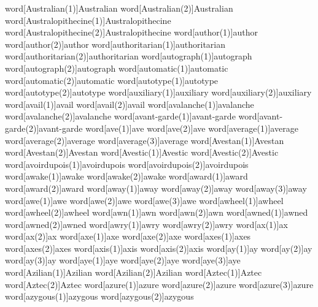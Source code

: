 word[Australian(1)]{Australian}
word[Australian(2)]{Australian}
word[Australopithecine(1)]{Australopithecine}
word[Australopithecine(2)]{Australopithecine}
word[author(1)]{author}
word[author(2)]{author}
word[authoritarian(1)]{authoritarian}
word[authoritarian(2)]{authoritarian}
word[autograph(1)]{autograph}
word[autograph(2)]{autograph}
word[automatic(1)]{automatic}
word[automatic(2)]{automatic}
word[autotype(1)]{autotype}
word[autotype(2)]{autotype}
word[auxiliary(1)]{auxiliary}
word[auxiliary(2)]{auxiliary}
word[avail(1)]{avail}
word[avail(2)]{avail}
word[avalanche(1)]{avalanche}
word[avalanche(2)]{avalanche}
word[avant-garde(1)]{avant-garde}
word[avant-garde(2)]{avant-garde}
word[ave(1)]{ave}
word[ave(2)]{ave}
word[average(1)]{average}
word[average(2)]{average}
word[average(3)]{average}
word[Avestan(1)]{Avestan}
word[Avestan(2)]{Avestan}
word[Avestic(1)]{Avestic}
word[Avestic(2)]{Avestic}
word[avoirdupois(1)]{avoirdupois}
word[avoirdupois(2)]{avoirdupois}
word[awake(1)]{awake}
word[awake(2)]{awake}
word[award(1)]{award}
word[award(2)]{award}
word[away(1)]{away}
word[away(2)]{away}
word[away(3)]{away}
word[awe(1)]{awe}
word[awe(2)]{awe}
word[awe(3)]{awe}
word[awheel(1)]{awheel}
word[awheel(2)]{awheel}
word[awn(1)]{awn}
word[awn(2)]{awn}
word[awned(1)]{awned}
word[awned(2)]{awned}
word[awry(1)]{awry}
word[awry(2)]{awry}
word[ax(1)]{ax}
word[ax(2)]{ax}
word[axe(1)]{axe}
word[axe(2)]{axe}
word[axes(1)]{axes}
word[axes(2)]{axes}
word[axis(1)]{axis}
word[axis(2)]{axis}
word[ay(1)]{ay}
word[ay(2)]{ay}
word[ay(3)]{ay}
word[aye(1)]{aye}
word[aye(2)]{aye}
word[aye(3)]{aye}
word[Azilian(1)]{Azilian}
word[Azilian(2)]{Azilian}
word[Aztec(1)]{Aztec}
word[Aztec(2)]{Aztec}
word[azure(1)]{azure}
word[azure(2)]{azure}
word[azure(3)]{azure}
word[azygous(1)]{azygous}
word[azygous(2)]{azygous}
